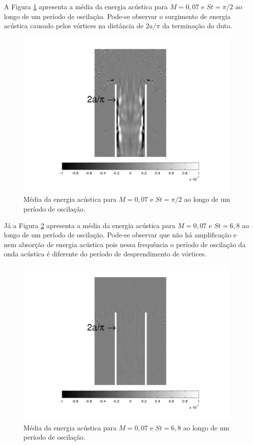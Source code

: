 \vfill
\clearpage

\newpage
\vfill
A Figura \ref{fig:max_007_media} apresenta a média da energia acústica para $M = 0,07$ e $St = \pi/2$ ao longo de um período de oscilação. Pode-se observar o surgimento de energia acústica causado pelos vórtices na distância de $2a/\pi$ da terminação do duto.

\begin{figure}[ht!]
\centering
  \includegraphics[width=0.62\linewidth]{figuras/max_007_media.png}
  \caption[Média da energia acústica para $M = 0,07$ e $St = \pi/2$.]{Média da energia acústica para $M = 0,07$ e $St = \pi/2$ ao longo de um período de oscilação.}
  \label{fig:max_007_media}
\end{figure}

Já a Figura \ref{fig:min_007_media} apresenta a média da energia acústica para $M = 0,07$ e $St = 6,8$ ao longo de um período de oscilação. Pode-se observar que não há amplificação e nem absorção de energia acústica pois nessa frequência o período de oscilação da onda acústica é diferente do período de desprendimento de vórtices. 

\begin{figure}[ht!]
\centering
  \includegraphics[width=0.62\linewidth]{figuras/min_007_media.png}
  \caption[Média da energia acústica para $M = 0,07$ e $St = \pi/2$.]{Média da energia acústica para $M = 0,07$ e $St = 6,8$ ao longo de um período de oscilação.}
  \label{fig:min_007_media}
\end{figure}
\vfill
\clearpage

